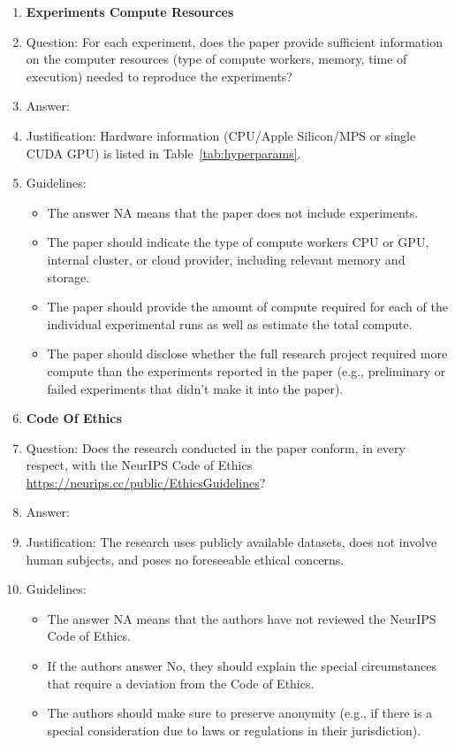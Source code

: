 \documentclass{article}
\theoremstyle{plain}
\theoremstyle{definition}
\begin{document}
\begin{enumerate}
  \item {\bf Experiments Compute Resources}
  \item[] Question: For each experiment, does the paper provide sufficient information on the computer resources (type of compute workers, memory, time of execution) needed to reproduce the experiments?
  \item[] Answer: \answerYes{}
  \item[] Justification: Hardware information (CPU/Apple Silicon/MPS or single CUDA GPU) is listed in Table~\ref{tab:hyperparams}.
  \item[] Guidelines:
    \begin{itemize}
      \item The answer NA means that the paper does not include experiments.
      \item The paper should indicate the type of compute workers CPU or GPU, internal cluster, or cloud provider, including relevant memory and storage.
      \item The paper should provide the amount of compute required for each of the individual experimental runs as well as estimate the total compute.
      \item The paper should disclose whether the full research project required more compute than the experiments reported in the paper (e.g., preliminary or failed experiments that didn't make it into the paper).
    \end{itemize}

  \item {\bf Code Of Ethics}
  \item[] Question: Does the research conducted in the paper conform, in every respect, with the NeurIPS Code of Ethics \url{https://neurips.cc/public/EthicsGuidelines}?
  \item[] Answer: \answerYes{}
  \item[] Justification: The research uses publicly available datasets, does not involve human subjects, and poses no foreseeable ethical concerns.
  \item[] Guidelines:
    \begin{itemize}
      \item The answer NA means that the authors have not reviewed the NeurIPS Code of Ethics.
      \item If the authors answer No, they should explain the special circumstances that require a deviation from the Code of Ethics.
      \item The authors should make sure to preserve anonymity (e.g., if there is a special consideration due to laws or regulations in their jurisdiction).
    \end{itemize}


\end{enumerate}
\end{document}
